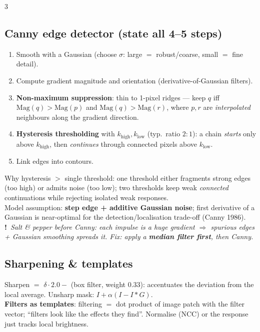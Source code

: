 \documentclass[9pt,a4paper,landscape]{extarticle}
\newcommand{\key}[1]{\textbf{#1}}
\newcommand{\tr}[1]{{\color{trap}\textbf{!}}\ \textit{#1}}
\begin{document}
\begin{multicols}{3}
\subsection{Canny edge detector (state all 4--5 steps)}
\begin{enumerate}
\item Smooth with a Gaussian (choose $\sigma$: large $=$ robust/coarse, small $=$ fine detail).
\item Compute gradient magnitude and orientation (derivative-of-Gaussian filters).
\item \key{Non-maximum suppression}: thin to 1-pixel ridges --- keep $q$ iff $\mathrm{Mag}(q)>\mathrm{Mag}(p)$ and $\mathrm{Mag}(q)>\mathrm{Mag}(r)$, where $p,r$ are \emph{interpolated} neighbours along the gradient direction.
\item \key{Hysteresis thresholding} with $k_{\text{high}},k_{\text{low}}$ (typ.\ ratio $2{:}1$): a chain \emph{starts} only above $k_{\text{high}}$, then \emph{continues} through connected pixels above $k_{\text{low}}$.
\item Link edges into contours.
\end{enumerate}
Why hysteresis $>$ single threshold: one threshold either fragments strong edges (too high) or admits noise (too low); two thresholds keep weak \emph{connected} continuations while rejecting isolated weak responses.\\
Model assumption: \key{step edge + additive Gaussian noise}; first derivative of a Gaussian is near-optimal for the detection/localisation trade-off (Canny 1986).\\
\tr{Salt \& pepper before Canny: each impulse is a huge gradient $\Rightarrow$ spurious edges + Gaussian smoothing spreads it. Fix: apply a \key{median filter first}, then Canny.}

\subsection{Sharpening \& templates}
Sharpen $=$ $\delta\cdot 2.0 - $ (box filter, weight $0.33$): accentuates the deviation from the local average. Unsharp mask: $I+\alpha(I-I*G)$.\\
\key{Filters as templates}: filtering $=$ dot product of image patch with the filter vector; ``filters look like the effects they find''. Normalise (NCC) or the response just tracks local brightness.


\end{multicols}
\end{document}
